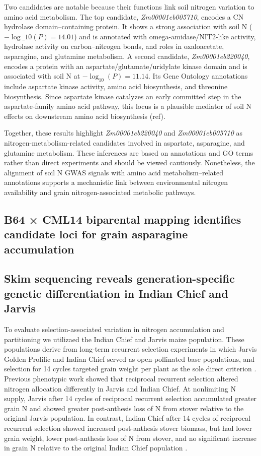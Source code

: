 \documentclass[pdflatex,sn-mathphys-num]{sn-jnl}%
\theoremstyle{thmstyleone}%
\theoremstyle{thmstyletwo}%
\theoremstyle{thmstylethree}%
\begin{document}
Two candidates are notable because their functions link soil nitrogen variation to amino acid metabolism. The top candidate, \textit{Zm00001eb005710}, encodes a CN hydrolase domain–containing protein. It shows a strong association with soil N ($-\log\_{10}(P) = 14.01$) and is annotated with omega-amidase/NIT2-like activity, hydrolase activity on carbon–nitrogen bonds, and roles in oxaloacetate, asparagine, and glutamine metabolism. A second candidate, \textit{Zm00001eb220040}, encodes a protein with an aspartate/glutamate/uridylate kinase domain and is associated with soil N at $-\log_{10}(P) = 11.14$. Its Gene Ontology annotations include aspartate kinase activity, amino acid biosynthesis, and threonine biosynthesis. Since aspartate kinase catalyzes an early committed step in the aspartate-family amino acid pathway, this locus is a plausible mediator of soil N effects on downstream amino acid biosynthesis (ref).

Together, these results highlight \textit{Zm00001eb220040} and \textit{Zm00001eb005710} as nitrogen-metabolism-related candidates involved in aspartate, asparagine, and glutamine metabolism. These inferences are based on annotations and GO terms rather than direct experiments and should be viewed cautiously. Nonetheless, the alignment of soil N GWAS signals with amino acid metabolism–related annotations supports a mechanistic link between environmental nitrogen availability and grain nitrogen-associated metabolic pathways.


\subsection{B64 × CML14 biparental mapping identifies candidate loci for grain asparagine accumulation}


\subsection{Skim sequencing reveals generation-specific genetic differentiation in Indian Chief and Jarvis}

To evaluate selection-associated variation in nitrogen accumulation and partitioning we utilizaed the Indian Chief and Jarvis maize population.  These populations derive from long-term recurrent selection experiments in which Jarvis Golden Prolific and Indian Chief served as open-pollinated base populations, and selection for 14 cycles targeted grain weight per plant as the sole direct criterion \citep{Moll1994}. Previous phenotypic work showed that reciprocal recurrent selection altered nitrogen allocation differently in Jarvis and Indian Chief. At nonlimiting N supply, Jarvis after 14 cycles of reciprocal recurrent selection accumulated greater grain N and showed greater post-anthesis loss of N from stover relative to the original Jarvis population. In contrast, Indian Chief after 14 cycles of reciprocal recurrent selection showed increased post-anthesis stover biomass, but had lower grain weight, lower post-anthesis loss of N from stover, and no significant increase in grain N relative to the original Indian Chief population \citep{Moll1994}.
\end{document}
